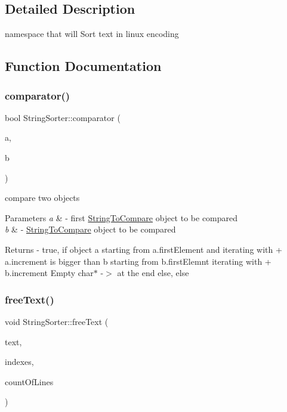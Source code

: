 \subsection{Detailed Description}
namespace that will Sort text in linux encoding 

\subsection{Function Documentation}
\mbox{\label{namespaceStringSorter_aaec9bf5e9700c12c60a776b1bfa1482a}} 
\subsubsection{\texorpdfstring{comparator()}{comparator()}}
{\footnotesize\ttfamily bool String\+Sorter\+::comparator (\begin{DoxyParamCaption}\item[{\hyperlink{classStringSorter_1_1StringToCompare}{String\+To\+Compare} \&\&}]{a,  }\item[{\hyperlink{classStringSorter_1_1StringToCompare}{String\+To\+Compare} \&\&}]{b }\end{DoxyParamCaption})}

compare two objects 
\begin{DoxyParams}{Parameters}
{\em a} & -\/ first \hyperlink{classStringSorter_1_1StringToCompare}{String\+To\+Compare} object to be compared \\
\hline
{\em b} & -\/ \hyperlink{classStringSorter_1_1StringToCompare}{String\+To\+Compare} object to be compared \\
\hline
\end{DoxyParams}
\begin{DoxyReturn}{Returns}
-\/ true, if object a starting from a.\+first\+Element and iterating with + a.\+increment is bigger than b starting from b.\+first\+Elemnt iterating with + b.\+increment Empty char$\ast$ -\/$>$ at the end else, else 
\end{DoxyReturn}
\mbox{\label{namespaceStringSorter_a49226981ae6a4fcc57865d9e2ba82d76}} 
\subsubsection{\texorpdfstring{free\+Text()}{freeText()}}
{\footnotesize\ttfamily void String\+Sorter\+::free\+Text (\begin{DoxyParamCaption}\item[{char $\ast$}]{text,  }\item[{size\+\_\+t $\ast$}]{indexes,  }\item[{size\+\_\+t}]{count\+Of\+Lines }\end{DoxyParamCaption})}

